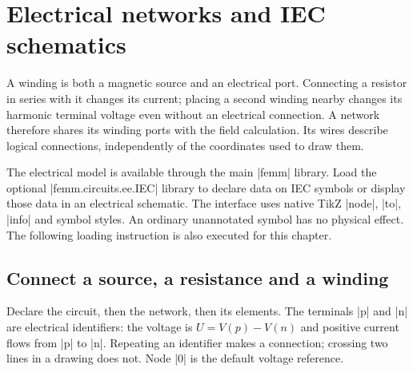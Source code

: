 \section{Electrical networks and IEC schematics}
\label{sec:electrical-networks}

A winding is both a magnetic source and an electrical port. Connecting a resistor
in series with it changes its current; placing a second winding nearby changes
its harmonic terminal voltage even without an electrical connection. A network
therefore shares its winding ports with the field calculation. Its wires describe
logical connections, independently of the coordinates used to draw them.

The electrical model is available through the main |femm| library. Load the
optional |femm.circuits.ee.IEC| library to declare data on IEC symbols or display
those data in an electrical schematic. The interface uses native TikZ |node|,
|to|, |info| and symbol styles. An ordinary unannotated symbol has no physical
effect. The following loading instruction is also executed for this chapter.
\begin{codeexample}
\usetikzlibrary{femm.circuits.ee.IEC}
\end{codeexample}

\subsection{Connect a source, a resistance and a winding}
Declare the circuit, then the network, then its elements. The terminals |p| and
|n| are electrical identifiers: the voltage is $U=V(p)-V(n)$ and positive current
flows from |p| to |n|. Repeating an identifier makes a connection; crossing two
lines in a drawing does not. Node |0| is the default voltage reference.

\begin{codeexample}[width=0pt]
\end{codeexample}

